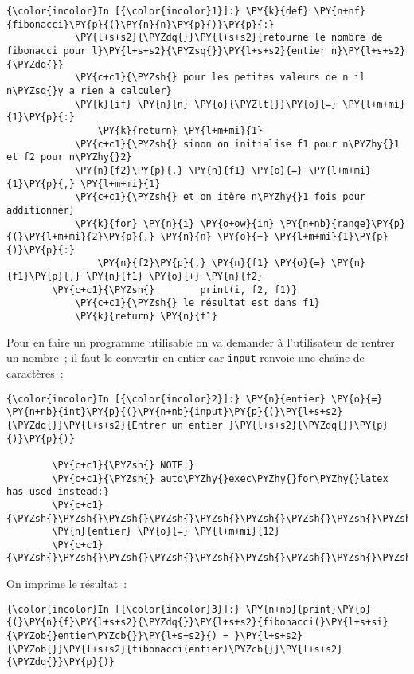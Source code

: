     \begin{Verbatim}[commandchars=\\\{\}]
{\color{incolor}In [{\color{incolor}1}]:} \PY{k}{def} \PY{n+nf}{fibonacci}\PY{p}{(}\PY{n}{n}\PY{p}{)}\PY{p}{:}
            \PY{l+s+s2}{\PYZdq{}}\PY{l+s+s2}{retourne le nombre de fibonacci pour l}\PY{l+s+s2}{\PYZsq{}}\PY{l+s+s2}{entier n}\PY{l+s+s2}{\PYZdq{}}
            \PY{c+c1}{\PYZsh{} pour les petites valeurs de n il n\PYZsq{}y a rien à calculer}
            \PY{k}{if} \PY{n}{n} \PY{o}{\PYZlt{}}\PY{o}{=} \PY{l+m+mi}{1}\PY{p}{:}
                \PY{k}{return} \PY{l+m+mi}{1}
            \PY{c+c1}{\PYZsh{} sinon on initialise f1 pour n\PYZhy{}1 et f2 pour n\PYZhy{}2}
            \PY{n}{f2}\PY{p}{,} \PY{n}{f1} \PY{o}{=} \PY{l+m+mi}{1}\PY{p}{,} \PY{l+m+mi}{1}
            \PY{c+c1}{\PYZsh{} et on itère n\PYZhy{}1 fois pour additionner}
            \PY{k}{for} \PY{n}{i} \PY{o+ow}{in} \PY{n+nb}{range}\PY{p}{(}\PY{l+m+mi}{2}\PY{p}{,} \PY{n}{n} \PY{o}{+} \PY{l+m+mi}{1}\PY{p}{)}\PY{p}{:}
                \PY{n}{f2}\PY{p}{,} \PY{n}{f1} \PY{o}{=} \PY{n}{f1}\PY{p}{,} \PY{n}{f1} \PY{o}{+} \PY{n}{f2}
        \PY{c+c1}{\PYZsh{}        print(i, f2, f1)}
            \PY{c+c1}{\PYZsh{} le résultat est dans f1}
            \PY{k}{return} \PY{n}{f1}
\end{Verbatim}


    Pour en faire un programme utilisable on va demander à l'utilisateur de
rentrer un nombre~; il faut le convertir en entier car \texttt{input}
renvoie une chaîne de caractères~:

    \begin{Verbatim}[commandchars=\\\{\}]
{\color{incolor}In [{\color{incolor}2}]:} \PY{n}{entier} \PY{o}{=} \PY{n+nb}{int}\PY{p}{(}\PY{n+nb}{input}\PY{p}{(}\PY{l+s+s2}{\PYZdq{}}\PY{l+s+s2}{Entrer un entier }\PY{l+s+s2}{\PYZdq{}}\PY{p}{)}\PY{p}{)}
        
        \PY{c+c1}{\PYZsh{} NOTE:}
        \PY{c+c1}{\PYZsh{} auto\PYZhy{}exec\PYZhy{}for\PYZhy{}latex has used instead:}
        \PY{c+c1}{\PYZsh{}\PYZsh{}\PYZsh{}\PYZsh{}\PYZsh{}\PYZsh{}\PYZsh{}\PYZsh{}\PYZsh{}\PYZsh{}}
        \PY{n}{entier} \PY{o}{=} \PY{l+m+mi}{12}
        \PY{c+c1}{\PYZsh{}\PYZsh{}\PYZsh{}\PYZsh{}\PYZsh{}\PYZsh{}\PYZsh{}\PYZsh{}\PYZsh{}\PYZsh{}}
\end{Verbatim}


    On imprime le résultat~:

    \begin{Verbatim}[commandchars=\\\{\}]
{\color{incolor}In [{\color{incolor}3}]:} \PY{n+nb}{print}\PY{p}{(}\PY{n}{f}\PY{l+s+s2}{\PYZdq{}}\PY{l+s+s2}{fibonacci(}\PY{l+s+si}{\PYZob{}entier\PYZcb{}}\PY{l+s+s2}{) = }\PY{l+s+s2}{\PYZob{}}\PY{l+s+s2}{fibonacci(entier)\PYZcb{}}\PY{l+s+s2}{\PYZdq{}}\PY{p}{)}
\end{Verbatim}


